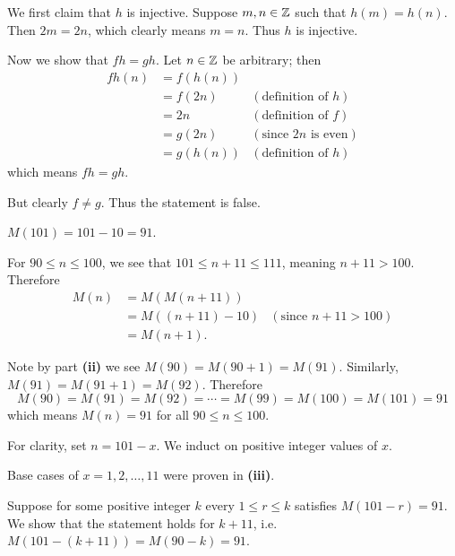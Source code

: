 \begin{questions}
\begin{partquestions}{\alph*}
        We first claim that $h$ is injective. Suppose $m,n\in\mathbb{Z}$ such that $h(m) = h(n)$. Then $2m = 2n$, which clearly means $m = n$. Thus $h$ is injective.

        Now we show that $fh = gh$. Let $n \in \mathbb{Z}$ be arbitrary; then
        \begin{align*}
            fh(n) &= f(h(n))\\
            &= f(2n) & (\text{definition of } h)\\
            &= 2n & (\text{definition of } f)\\
            &= g(2n) & (\text{since } 2n \text{ is even})\\
            &= g(h(n)) & (\text{definition of } h)
        \end{align*}
        which means $fh = gh$.

        But clearly $f \neq g$. Thus the statement is false.
    \end{partquestions}

    \item \begin{partquestions}{\roman*}
        \item $M(101) = 101 - 10 = 91$.
        
        \item For $90 \leq n \leq 100$, we see that $101 \leq n+11 \leq 111$, meaning $n+11 > 100$. Therefore
        \begin{align*}
            M(n) &= M(M(n+11))\\
            &= M((n+11) - 10) & (\text{since } n+11 > 100)\\
            &= M(n+1).
        \end{align*}

        \item Note by part \textbf{(ii)} we see $M(90) = M(90 + 1) = M(91)$. Similarly, $M(91) = M(91 + 1) = M(92)$. Therefore
        \[
            M(90) = M(91) = M(92) = \cdots = M(99) = M(100) = M(101) = 91
        \]
        which means $M(n) = 91$ for all $90 \leq n \leq 100$.

        \item For clarity, set $n = 101 - x$. We induct on positive integer values of $x$.
        
        Base cases of $x = 1, 2, \dots, 11$ were proven in \textbf{(iii)}.

        Suppose for some positive integer $k$ every $1 \leq r \leq k$ satisfies $M(101 - r) = 91$. We show that the statement holds for $k + 11$, i.e. $M(101 - (k+11)) = M(90 - k) = 91$.


\end{partquestions}
\end{questions}
